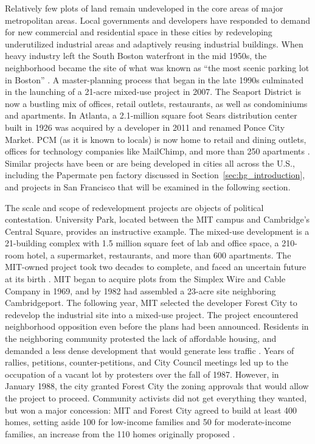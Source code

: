 \documentclass[article,12pt]{memoir}
\begin{document}
Relatively few plots of land remain undeveloped in the core areas of major metropolitan areas.  Local governments and developers have responded to demand for new commercial and residential space in these cities by redeveloping underutilized industrial areas and adaptively reusing industrial buildings.  When heavy industry left the South Boston waterfront in the mid 1950s, the neighborhood became the site of what was known as ``the most scenic parking lot in Boston'' \citep{cortese_empty_2007}.  A master-planning process that began in the late 1990s culminated in the launching of a 21-acre mixed-use project in 2007.  The Seaport District is now a bustling mix of offices, retail outlets, restaurants, as well as condominiums and apartments.  In Atlanta, a 2.1-million square foot Sears distribution center built in 1926 was acquired by a developer in 2011 and renamed Ponce City Market. PCM (as it is known to locals) is now home to retail and dining outlets, offices for technology companies like MailChimp, and more than 250 apartments \citep{brown_ambitious_2011}.  Similar projects have been or are being developed in cities all across the U.S., including the Papermate pen factory discussed in Section~\ref{sec:hg_introduction}, and projects in San Francisco that will be examined in the following section.

The scale and scope of redevelopment projects are objects of political contestation.  University Park, located between the MIT campus and Cambridge's Central Square, provides an instructive example.  The mixed-use development is a 21-building complex with 1.5 million square feet of lab and office space, a 210-room hotel, a supermarket, restaurants, and more than 600 apartments.  The MIT-owned project took two decades to complete, and faced an uncertain future at its birth \citep{diesenhouse_grand_2005}.  MIT began to acquire plots from the Simplex Wire and Cable Company in 1969, and by 1982 had assembled a 23-acre site neighboring Cambridgeport. The following year, MIT selected the developer Forest City to redevelop the industrial site into a mixed-use project.  The project encountered neighborhood opposition even before the plans had been announced.  Residents in the neighboring  community protested the lack of affordable housing, and demanded a less dense development that would generate less traffic \citep{ackerman_mits_1989}. Years of rallies, petitions, counter-petitions, and City Council meetings led up to the occupation of a vacant lot by protesters over the fall of 1987.  However, in January 1988, the city granted Forest City the zoning approvals that would allow the project to proceed.  Community activists did not get everything they wanted, but won a major concession: MIT and Forest City agreed to build at least 400 homes, setting aside 100 for low-income families and 50 for moderate-income families, an increase from the 110 homes originally proposed \citep{yudis_years_1988}.
\end{document}
